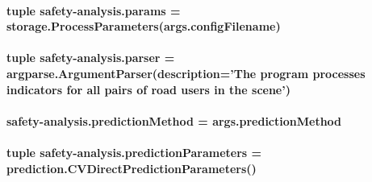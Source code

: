 \hypertarget{namespacesafety-analysis_a4cb92f5f2e336a81cd2d9dda6270e90c}{
\paragraph[{params}]{\setlength{\rightskip}{0pt plus 5cm}tuple safety-\/analysis.\-params = {\bf storage.\-Process\-Parameters}(args.\-config\-Filename)}}\label{namespacesafety-analysis_a4cb92f5f2e336a81cd2d9dda6270e90c}
\hypertarget{namespacesafety-analysis_a77f1f12446258d158fe4c175f2e00c8a}{
\paragraph[{parser}]{\setlength{\rightskip}{0pt plus 5cm}tuple safety-\/analysis.\-parser = argparse.\-Argument\-Parser(description='The program processes indicators for all pairs of road users in the scene')}}\label{namespacesafety-analysis_a77f1f12446258d158fe4c175f2e00c8a}
\hypertarget{namespacesafety-analysis_af447253965234be3b5a97d6867eb3864}{
\paragraph[{prediction\-Method}]{\setlength{\rightskip}{0pt plus 5cm}safety-\/analysis.\-prediction\-Method = args.\-prediction\-Method}}\label{namespacesafety-analysis_af447253965234be3b5a97d6867eb3864}
\hypertarget{namespacesafety-analysis_abff9643a4f33b02547c31562a8ca4fd3}{
\paragraph[{prediction\-Parameters}]{\setlength{\rightskip}{0pt plus 5cm}tuple safety-\/analysis.\-prediction\-Parameters = {\bf prediction.\-C\-V\-Direct\-Prediction\-Parameters}()}}\label{namespacesafety-analysis_abff9643a4f33b02547c31562a8ca4fd3}
